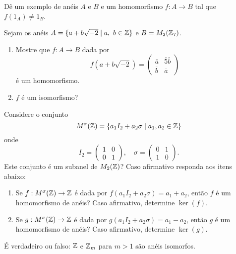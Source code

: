 \documentclass[12pt]{exam}
\begin{document}
\vspace{.3cm}

\questao{} Dê um exemplo de anéis $A$ e $B$ e um homomorfismo $f : A \to B$ tal que $f(1_A) \ne 1_B$.

\vspace{.3cm}

\questao{} Sejam os anéis $A = \{ a + b\sqrt{-2} \mid a,\ b \in \mathbb{Z}\}$ e $B = M_2(\mathbb{Z}_7)$.
\begin{enumerate}[label=({\alph*})]
    \item Mostre que $f : A \to B$ dada por
    \[
    f(a + b\sqrt{-2}) =
    \begin{pmatrix}
        \overline{a} & \overline{5}\overline{b}\\
        \overline{b} & \overline{a}
    \end{pmatrix}
    \]
    é um homomorfismo.

    \item $f$ é um isomorfismo?
\end{enumerate}

\vspace{.3cm}

\questao{} Considere o conjunto
\[
M^\sigma(\mathbb{Z}) = \{a_1I_2 + a_2\sigma \mid a_1, a_2 \in \mathbb{Z}\}
\]
onde
\[
I_2 = \begin{pmatrix} 1 & 0\\ 0 & 1\end{pmatrix}, \quad \sigma = \begin{pmatrix} 0 & 1\\ 1 & 0\end{pmatrix}.
\]
Este conjunto é um subanel de $M_2(\mathbb{Z})$? Caso afirmativo responda aos itens abaixo:
\begin{enumerate}[label=({\alph*})]
    \item Se $f : M^\sigma(\mathbb{Z}) \to \mathbb{Z}$ é dada por $f(a_1I_2 + a_2\sigma) = a_1 + a_2$, então $f$ é um homomorfismo de anéis? Caso afirmativo, determine $\ker(f)$.

    \item Se $g : M^\sigma(\mathbb{Z}) \to \mathbb{Z}$ é dada por $g(a_1I_2 + a_2\sigma) = a_1 - a_2$, então $g$ é um homomorfismo de anéis? Caso afirmativo, determine $\ker(g)$.
\end{enumerate}

\vspace{.3cm}

\questao{} {É} verdadeiro ou falso: $\mathbb{Z}$ e $\mathbb{Z}_{m}$ para $m > 1$ são anéis
isomorfos.

\vspace{.3cm}
\end{document}
